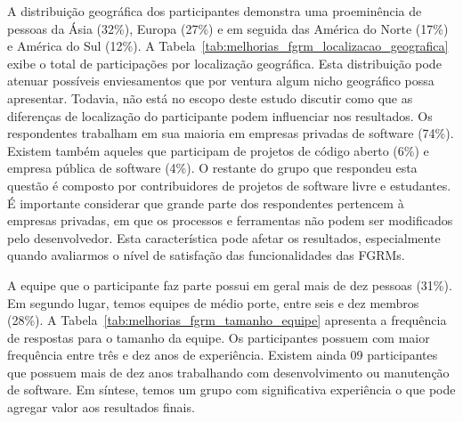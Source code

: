 A distribuição geográfica dos participantes demonstra uma proeminência de
pessoas da Ásia (32\%), Europa (27\%) e em seguida das América do Norte (17\%)
e América do Sul (12\%). A
Tabela~\ref{tab:melhorias_fgrm_localizacao_geografica} exibe o total de
participações por localização geográfica. Esta distribuição pode atenuar
possíveis enviesamentos que por ventura algum nicho geográfico possa
apresentar. Todavia, não está no escopo deste estudo discutir como que as
diferenças de localização do participante podem influenciar nos resultados. Os
respondentes trabalham em sua maioria em empresas privadas de software (74\%).
Existem também aqueles que participam de projetos de código aberto (6\%) e
empresa pública de software (4\%). O restante do grupo que respondeu esta
questão é composto por contribuidores de projetos de software livre e
estudantes. É importante considerar que grande parte dos respondentes pertencem
à empresas privadas, em que os processos e ferramentas não podem ser
modificados pelo desenvolvedor. Esta característica pode afetar os resultados,
especialmente quando avaliarmos o nível de satisfação das funcionalidades das
FGRMs.

\begin{table}[htpb]
\centering
{}
\caption{Localização Geográfica dos Participantes}\label{tab:melhorias_fgrm_localizacao_geografica}
\end{table}

A equipe que o participante faz parte possui em geral mais de dez pessoas
(31\%). Em segundo lugar, temos equipes de médio porte, entre seis e dez
membros (28\%). A Tabela~\ref{tab:melhorias_fgrm_tamanho_equipe} apresenta a
frequência de respostas para o tamanho da equipe. Os participantes possuem com
maior frequência entre três e dez anos de experiência. Existem ainda 09
participantes que possuem mais de dez anos trabalhando com desenvolvimento ou
manutenção de software. Em síntese, temos um grupo com significativa
experiência o que pode agregar valor aos resultados finais.


